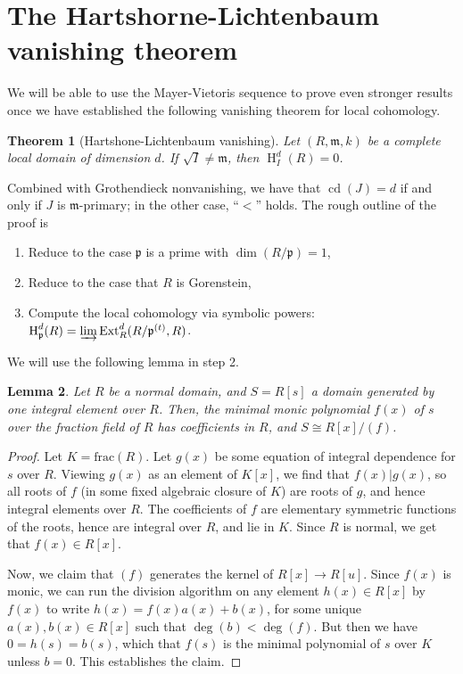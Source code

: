 \documentclass[11pt]{book}
\newtheorem{theorem}{Theorem}[chapter]
\newtheorem{lemma}[theorem]{Lemma}
\numberwithin{equation}{section}
\numberwithin{theorem}{chapter}
\theoremstyle{definition}
\newtheorem*{basic properties}{Basic Properties}
\newtheorem*{Important Remark}{Important Remark}
\theoremstyle{remark}
\newcommand{\m}{\mathfrak{m}}
\newcommand{\p}{\mathfrak{p}}
\newcommand{\Ext}{\operatorname{Ext}}
\DeclareMathOperator{\cd}{cd}
\renewcommand{\dim}{\operatorname{dim}}
\renewcommand{\H}{\operatorname{H}}
\begin{document}
\section{The Hartshorne-Lichtenbaum vanishing theorem}

We will be able to use the Mayer-Vietoris sequence to prove even stronger results once we have established the following vanishing theorem for local cohomology.

\begin{theorem}[Hartshone-Lichtenbaum vanishing]
	Let $(R,\m,k)$ be a complete local domain of dimension $d$. If $\sqrt{I}\neq \m$, then $\H^d_{I}(R)=0$.
\end{theorem}

Combined with Grothendieck nonvanishing, we have that $\cd(J)=d$ if and only if $J$ is $\m$-primary; in the other case, ``$<$'' holds. The rough outline of the proof is
\begin{enumerate}
	\item Reduce to the case $\p$ is a prime with $\dim(R/\p)=1$,
	\item Reduce to the case that $R$ is Gorenstein,
	\item Compute the local cohomology via symbolic powers: $\H^d_{\p}(R)=\varinjlim \Ext^{d}_R(R/\p^{(t)},R)$.
\end{enumerate}

We will use the following lemma in step 2.

\begin{lemma}
	Let $R$ be a normal domain, and $S=R[s]$ a domain generated by one integral element over $R$. Then, the minimal monic polynomial $f(x)$ of $s$ over the fraction field of $R$ has coefficients in $R$, and $S\cong R[x]/(f)$.
\end{lemma}
\begin{proof}
	Let $K=\mathrm{frac}(R)$. Let $g(x)$ be some equation of integral dependence for $s$ over $R$. Viewing $g(x)$ as an element of $K[x]$, we find that $f(x) | g(x)$, so all roots of $f$ (in some fixed algebraic closure of $K$) are roots of $g$, and hence integral elements over $R$. The coefficients of $f$ are elementary symmetric functions of the roots, hence are integral over $R$, and lie in $K$. Since $R$ is normal, we get that $f(x)\in R[x]$.
	
	Now, we claim that $(f)$ generates the kernel of $R[x]\to R[u]$. Since $f(x)$ is monic, we can run the division algorithm on any element $h(x)\in R[x]$ by $f(x)$ to write $h(x)=f(x)a(x)+b(x)$, for some unique $a(x),b(x)\in R[x]$ such that $\deg(b)<\deg(f)$. But then we have $0=h(s)=b(s)$, which that $f(s)$ is the minimal polynomial of $s$ over $K$ unless $b=0$. This establishes the claim.
\end{proof}
\end{document}
